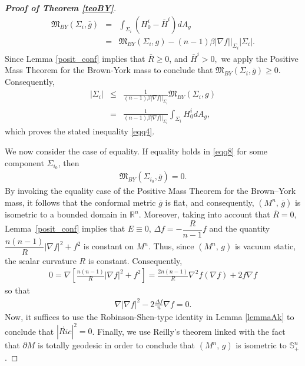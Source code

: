 \documentclass{amsart}
\numberwithin{equation}{section}
\begin{document}
\begin{proof}[{\bf Proof of Theorem \ref{teoBY}}]
		\begin{eqnarray}
			\label{eqq7}
			\mathfrak{M}_{BY}(\Sigma_i,\overline{g})&=& \int_{\Sigma_i}(H_{0}^{i}-\overline{H}^{i}) dA_g\nonumber\\
			&=& \mathfrak{M}_{BY}(\Sigma_i,g)-(n-1)\beta|\nabla f|\Big|_{{\Sigma_i}}|\Sigma_i|.
		\end{eqnarray} Since Lemma \ref{posit_conf} implies that ${\overline{R}}\geq 0$,  and $\overline{H}^{i}>0,$ we apply the Positive Mass Theorem for the Brown-York mass \cite{Shi-Tam} to conclude that $\mathfrak{M}_{BY}(\Sigma_i,\overline{g})\geq 0.$ Consequently, 
		\begin{eqnarray}
			\label{eqq8}
			|\Sigma_i|&\leq &\frac{1}{(n-1)\beta|\nabla f|\big|_{{\Sigma_i}}}\mathfrak{M}_{BY}(\Sigma_i,g)\nonumber\\
			&=&\frac{1}{(n-1)\beta|\nabla f|\big|_{{\Sigma_i}}}\int_{\Sigma_i}H_{0}^{i} dA_g,
		\end{eqnarray} which proves the stated inequality \eqref{eqq4}.
		
		
		
		
		We now consider the case of equality. If equality holds in \eqref{eqq8} for some component $\Sigma_{i_{0}}$, then 		
		\begin{eqnarray*}
			\mathfrak{M}_{BY}(\Sigma_{i_{0}},\overline{g})=0.
		\end{eqnarray*} By invoking the equality case of the Positive Mass Theorem for the Brown–York mass, it follows that the conformal metric $\overline{g}$ is flat, and consequently, $(M^n,\,\overline{g})$ is isometric to a bounded domain in $\mathbb{R}^n$. Moreover, taking into account that ${\overline{R}}=0,$ Lemma~\ref{posit_conf} implies that $E\equiv 0$, $\Delta f=-\dfrac{R}{n-1}f$ and the quantity $\dfrac{n(n-1)}{R}|\nabla f|^2+f^2$ is constant on $M^n.$ Thus, since $(M^{n},\,g)$ is vacuum static, the scalar curvature $R$ is constant. Consequently, 
		\begin{eqnarray*}
			0=\nabla\left[\frac{n(n-1)}{R}|\nabla f|^2+f^2\right]=\frac{2n(n-1)}{R}\nabla^2 f(\nabla f)+2f\nabla f
		\end{eqnarray*}
		so that
		\begin{eqnarray*}
			\nabla|\nabla f|^2-2\frac{\Delta f}{n}\nabla f=0.
		\end{eqnarray*} Now, it suffices to use the Robinson-Shen-type identity in Lemma \ref{lemmaAk} to conclude that $|\mathring{Ric}|^2=0$. Finally, we use Reilly's theorem linked with the fact that $\partial M$ is totally geodesic in order to conclude that $(M^n,\,g)$ is isometric to $\mathbb{S}^{n}_{+}$. 
		

\end{proof}
\end{document}
